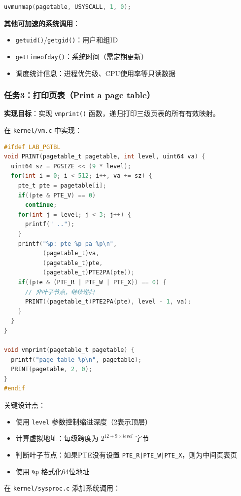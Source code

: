 \begin{lstlisting}[language=C]
uvmunmap(pagetable, USYSCALL, 1, 0);
\end{lstlisting}

\textbf{其他可加速的系统调用}：
\begin{itemize}
    \item \texttt{getuid()}/\texttt{getgid()}：用户和组ID
    \item \texttt{gettimeofday()}：系统时间（需定期更新）
    \item 调度统计信息：进程优先级、CPU使用率等只读数据
\end{itemize}

\subsubsection{任务3：打印页表（Print a page table）}

\textbf{实现目标}：实现 \texttt{vmprint()} 函数，递归打印三级页表的所有有效映射。

在 \texttt{kernel/vm.c} 中实现：

\begin{lstlisting}[language=C]
#ifdef LAB_PGTBL
void PRINT(pagetable_t pagetable, int level, uint64 va) {
  uint64 sz = PGSIZE << (9 * level);
  for(int i = 0; i < 512; i++, va += sz) {
    pte_t pte = pagetable[i];
    if((pte & PTE_V) == 0)
      continue;
    for(int j = level; j < 3; j++) {
      printf(" ..");
    }
    printf("%p: pte %p pa %p\n", 
           (pagetable_t)va, 
           (pagetable_t)pte, 
           (pagetable_t)PTE2PA(pte));
    if((pte & (PTE_R | PTE_W | PTE_X)) == 0) {
      // 非叶子节点，继续递归
      PRINT((pagetable_t)PTE2PA(pte), level - 1, va);
    }
  }
}

void vmprint(pagetable_t pagetable) {
  printf("page table %p\n", pagetable);
  PRINT(pagetable, 2, 0);
}
#endif
\end{lstlisting}

关键设计点：
\begin{itemize}
    \item 使用 \texttt{level} 参数控制缩进深度（2表示顶层）
    \item 计算虚拟地址：每级跨度为 $2^{12+9 \times level}$ 字节
    \item 判断叶子节点：如果PTE没有设置 \texttt{PTE\_R|PTE\_W|PTE\_X}，则为中间页表页
    \item 使用 \texttt{\%p} 格式化64位地址
\end{itemize}

在 \texttt{kernel/sysproc.c} 添加系统调用：

